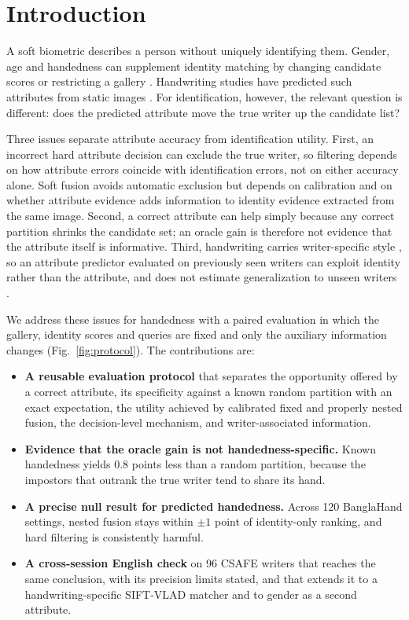 \section{Introduction}
A soft biometric describes a person without uniquely identifying them. Gender, age and handedness can supplement identity matching by changing candidate scores or restricting a gallery \cite{jain2004soft,jain2004integrating,dantcheva2016soft,nixon2015soft}. Handwriting studies have predicted such attributes from static images \cite{liwicki2011gender,siddiqi2015gender,bouadjenek2016soft,almaadeed2016handedness,morera2018handedness,rahmanian2021handedness}. For identification, however, the relevant question is different: does the predicted attribute move the true writer up the candidate list?

Three issues separate attribute accuracy from identification utility. First, an incorrect hard attribute decision can exclude the true writer, so filtering depends on how attribute errors coincide with identification errors, not on either accuracy alone. Soft fusion avoids automatic exclusion but depends on calibration and on whether attribute evidence adds information to identity evidence extracted from the same image. Second, a correct attribute can help simply because any correct partition shrinks the candidate set; an oracle gain is therefore not evidence that the attribute itself is informative. Third, handwriting carries writer-specific style \cite{bulacu2007text,schomaker2007codebooks}, so an attribute predictor evaluated on previously seen writers can exploit identity rather than the attribute, and does not estimate generalization to unseen writers \cite{kaufman2012leakage}.

We address these issues for handedness with a paired evaluation in which the gallery, identity scores and queries are fixed and only the auxiliary information changes (Fig.~\ref{fig:protocol}). The contributions are:
\begin{itemize}
\item \textbf{A reusable evaluation protocol} that separates the opportunity offered by a correct attribute, its specificity against a known random partition with an exact expectation, the utility achieved by calibrated fixed and properly nested fusion, the decision-level mechanism, and writer-associated information.
\item \textbf{Evidence that the oracle gain is not handedness-specific.} Known handedness yields 0.8 points less than a random partition, because the impostors that outrank the true writer tend to share its hand.
\item \textbf{A precise null result for predicted handedness.} Across 120 BanglaHand settings, nested fusion stays within $\pm1$ point of identity-only ranking, and hard filtering is consistently harmful.
\item \textbf{A cross-session English check} on 96 CSAFE writers \cite{crawford2020database,crawford2026csafe} that reaches the same conclusion, with its precision limits stated, and that extends it to a handwriting-specific SIFT-VLAD matcher and to gender as a second attribute.
\end{itemize}

